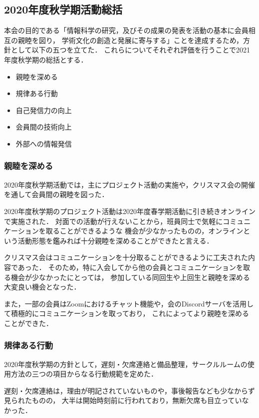 \subsection*{2020年度秋学期活動総括}


本会の目的である「情報科学の研究，及びその成果の発表を活動の基本に会員相互の親睦を図り，
学術文化の創造と発展に寄与する」ことを達成するため，方針として以下の五つを立てた．
これらについてそれぞれ評価を行うことで2021年度秋学期の総括とする．

\begin{itemize}
    \item 親睦を深める
    \item 規律ある行動
    \item 自己発信力の向上
    \item 会員間の技術向上
    \item 外部への情報発信
\end{itemize}

\subsubsection*{親睦を深める}
    2020年度秋学期活動では，主にプロジェクト活動の実施や，クリスマス会の開催を通して会員間の親睦を図った．

    2020年度秋学期のプロジェクト活動は2020年度春学期活動に引き続きオンラインで実施された．
    対面での活動が行えないことから，班員同士で気軽にコミュニケーションを取ることができるような
    機会が少なかったものの，オンラインという活動形態を鑑みれば十分親睦を深めることができたと言える．

    クリスマス会はコミュニケーションを十分取ることができるように工夫された内容であった．
    そのため，特に入会してから他の会員とコミュニケーションを取る機会が少なかった\firstGrade{}にとっては，
    参加している同回生や上回生と親睦を深める大変良い機会となった．

    また，一部の会員はZoomにおけるチャット機能や，会のDiscordサーバを活用して積極的にコミュニケーションを取っており，
    これによってより親睦を深めることができた．

\subsubsection*{規律ある行動}
    2020年度秋学期の方針として，遅刻・欠席連絡と備品整理，サークルルームの使用方法の三つの項目からなる行動規範を定めた．

    遅刻・欠席連絡は，理由が明記されていないものや，事後報告なども少なからず見られたものの，
    大半は開始時刻前に行われており，無断欠席も目立っていなかった．

